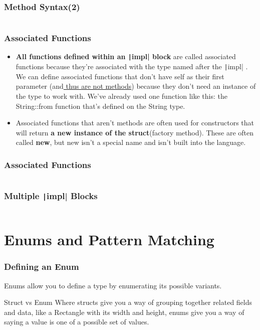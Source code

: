 \documentclass{beamer}
\begin{document}
\begin{frame}[fragile]
	\frametitle{Method Syntax(2)}
	\inputminted{rust}{./code/method.rs}
\end{frame}

\begin{frame}[fragile]
	\frametitle{Associated Functions}
	\begin{itemize}
		\item \textbf{All functions defined within an \texttt|impl|  block} are called associated functions because they’re associated with the type named after the  \texttt|impl| . We can define associated functions that don’t have self as their first parameter (and\underline{ thus are not methods}) because they don’t need an instance of the type to work with. We’ve already used one function like this: the String::from function that’s defined on the String type.
		\item 	Associated functions that aren’t methods are often used for constructors that will return \textbf{a new instance of the struct}(factory method). These are often called \textbf{new}, but new isn’t a special name and isn’t built into the language.
	\end{itemize}
\end{frame}

\begin{frame}[fragile]
	\frametitle{Associated Functions}
	\inputminted{rust}{./code/factory-method.rs}
\end{frame}

\begin{frame}[fragile]
	\frametitle{Multiple \texttt|impl| Blocks}
	\inputminted{rust}{./code/multi-impl.rs}
\end{frame}

\section{Enums and Pattern Matching}
\begin{frame}[fragile]
	\frametitle{Defining an Enum}
	Enums allow you to define a type by enumerating its possible variants.
	\begin{block}{Struct vs Enum}
	Where structs give you a way of grouping together related fields and data, like a Rectangle with its width and height, enums give you a way of saying a value is one of a possible set of values. 
	\end{block}
	\inputminted{rust}{./code/enum.rs}
\end{frame}
\end{document}
